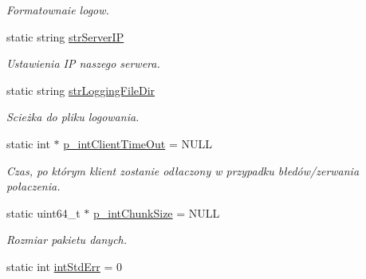 \begin{DoxyCompactItemize}
\begin{DoxyCompactList}\small\item\em Formatownaie logow. \item\end{DoxyCompactList}\item 
\hypertarget{classServerConfigs_adeb37d83ae4db09b26aecdcd5e593d00}{
static string \hyperlink{classServerConfigs_adeb37d83ae4db09b26aecdcd5e593d00}{strServerIP}}
\label{classServerConfigs_adeb37d83ae4db09b26aecdcd5e593d00}

\begin{DoxyCompactList}\small\item\em Ustawienia IP naszego serwera. \item\end{DoxyCompactList}\item 
\hypertarget{classServerConfigs_a6c9fa39932b507f17cd0cfc8753f32fa}{
static string \hyperlink{classServerConfigs_a6c9fa39932b507f17cd0cfc8753f32fa}{strLoggingFileDir}}
\label{classServerConfigs_a6c9fa39932b507f17cd0cfc8753f32fa}

\begin{DoxyCompactList}\small\item\em Scieżka do pliku logowania. \item\end{DoxyCompactList}\item 
\hypertarget{classServerConfigs_afcf905ce23547206d835f6b2281bbc8f}{
static int $\ast$ \hyperlink{classServerConfigs_afcf905ce23547206d835f6b2281bbc8f}{p\_\-intClientTimeOut} = NULL}
\label{classServerConfigs_afcf905ce23547206d835f6b2281bbc8f}

\begin{DoxyCompactList}\small\item\em Czas, po którym klient zostanie odłaczony w przypadku błedów/zerwania połaczenia. \item\end{DoxyCompactList}\item 
\hypertarget{classServerConfigs_a3ce8a0c3c2fc7f7c85e82b903c2e421f}{
static uint64\_\-t $\ast$ \hyperlink{classServerConfigs_a3ce8a0c3c2fc7f7c85e82b903c2e421f}{p\_\-intChunkSize} = NULL}
\label{classServerConfigs_a3ce8a0c3c2fc7f7c85e82b903c2e421f}

\begin{DoxyCompactList}\small\item\em Rozmiar pakietu danych. \item\end{DoxyCompactList}\item 
\hypertarget{classServerConfigs_a7b9ef5a59901632542066b8677de2d53}{
static int \hyperlink{classServerConfigs_a7b9ef5a59901632542066b8677de2d53}{intStdErr} = 0}
\label{classServerConfigs_a7b9ef5a59901632542066b8677de2d53}


\end{DoxyCompactItemize}
